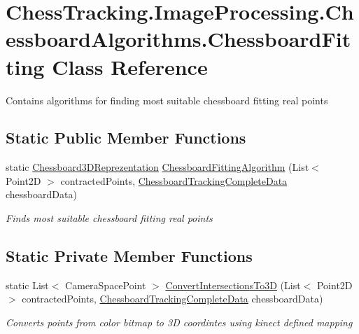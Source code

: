 \hypertarget{class_chess_tracking_1_1_image_processing_1_1_chessboard_algorithms_1_1_chessboard_fitting}{}\section{Chess\+Tracking.\+Image\+Processing.\+Chessboard\+Algorithms.\+Chessboard\+Fitting Class Reference}
\label{class_chess_tracking_1_1_image_processing_1_1_chessboard_algorithms_1_1_chessboard_fitting}


Contains algorithms for finding most suitable chessboard fitting real points  


\subsection*{Static Public Member Functions}
\begin{DoxyCompactItemize}
\item 
static \mbox{\hyperlink{class_chess_tracking_1_1_image_processing_1_1_chessboard_algorithms_1_1_chessboard3_d_reprezentation}{Chessboard3\+D\+Reprezentation}} \mbox{\hyperlink{class_chess_tracking_1_1_image_processing_1_1_chessboard_algorithms_1_1_chessboard_fitting_a8d010380bb014f202610f0fab5c427a2}{Chessboard\+Fitting\+Algorithm}} (List$<$ Point2D $>$ contracted\+Points, \mbox{\hyperlink{class_chess_tracking_1_1_image_processing_1_1_pipeline_data_1_1_chessboard_tracking_complete_data}{Chessboard\+Tracking\+Complete\+Data}} chessboard\+Data)
\begin{DoxyCompactList}\small\item\em Finds most suitable chessboard fitting real points \end{DoxyCompactList}\end{DoxyCompactItemize}
\subsection*{Static Private Member Functions}
\begin{DoxyCompactItemize}
\item 
static List$<$ Camera\+Space\+Point $>$ \mbox{\hyperlink{class_chess_tracking_1_1_image_processing_1_1_chessboard_algorithms_1_1_chessboard_fitting_a87da34a000832c139938b77f16a03127}{Convert\+Intersections\+To3D}} (List$<$ Point2D $>$ contracted\+Points, \mbox{\hyperlink{class_chess_tracking_1_1_image_processing_1_1_pipeline_data_1_1_chessboard_tracking_complete_data}{Chessboard\+Tracking\+Complete\+Data}} chessboard\+Data)
\begin{DoxyCompactList}\small\item\em Converts points from color bitmap to 3D coordintes using kinect defined mapping \end{DoxyCompactList}\end{DoxyCompactItemize}


